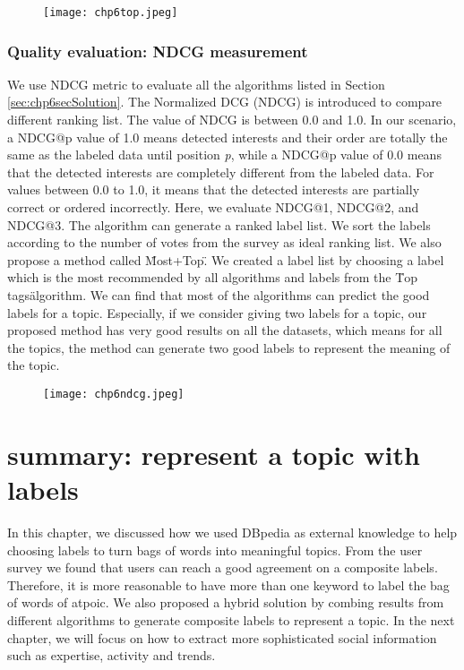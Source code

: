 \begin{figure}[htp]
\centering
\texttt{[image: chp6top.jpeg]}  
\caption{}
\label{fig:chp6top} 
\end{figure}


\subsubsection{Quality evaluation: NDCG measurement}
We use NDCG metric to evaluate all the algorithms listed in Section \ref{sec:chp6secSolution}. The Normalized DCG (NDCG) is introduced to compare different ranking list. The value of NDCG is between 0.0 and 1.0. In our scenario, a NDCG@p value of 1.0 means detected interests and their order are totally the same as the labeled data until position \textit{p}, while a NDCG@p value of 0.0 means that the detected interests are completely different from the labeled data. For values between 0.0 to 1.0, it means that the detected interests are partially correct or ordered incorrectly. %
Here, we evaluate NDCG@1, NDCG@2, and NDCG@3. The algorithm can generate a ranked label list. We sort the labels according to the number of votes from the survey as ideal ranking list. We also propose a method called \"Most+Top\". We created a label list by choosing a label which is the most recommended by all algorithms and labels from the \"Top tags\" algorithm. We can find that most of the algorithms can predict the good labels for a topic. Especially, if we consider giving two labels for a topic, our proposed method has very good results on all the datasets, which means for all the topics, the method can generate two good labels to represent the meaning of the topic.

\begin{figure}[htp]
\centering
\texttt{[image: chp6ndcg.jpeg]}  
\caption{}
\label{fig:chp6ndcg} 
\end{figure}




\section{summary: represent a topic with labels}
In this chapter, we discussed how we used DBpedia as external knowledge to help choosing labels to turn bags of words into meaningful topics. From the user survey we found that users can reach a good agreement on a composite labels. Therefore, it is more reasonable to have more than one keyword to label the bag of words of atpoic. We also proposed a hybrid solution by combing results from different algorithms to generate composite labels to represent a topic. In the next chapter, we will focus on how to extract more sophisticated social information such as expertise, activity and trends.
